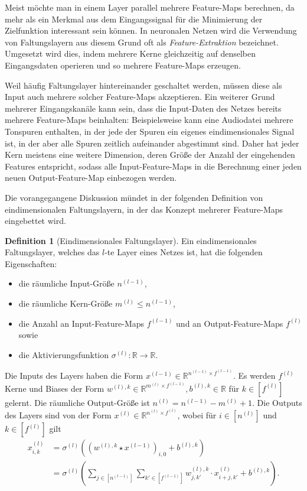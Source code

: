 \documentclass[paper=a4, 	%
		fontsize=11pt,
		abstract=true, 	%
		headsepline, 	%
		notitlepage	%
		]{scrartcl}
\theoremstyle{definition}
\newtheorem{definition}[theorem]{Definition}
\newcommand{\R}{\mathbb{R}}
\newcommand{\fNat}[1]{[ #1 ]}
\begin{document}
\medskip

Meist möchte man in einem Layer parallel mehrere Feature-Maps berechnen, da mehr als ein Merkmal aus dem Eingangssignal für die Minimierung der Zielfunktion interessant sein können.
In neuronalen Netzen wird die Verwendung von Faltungslayern aus diesem Grund oft als \emph{Feature-Extraktion} bezeichnet.
Umgesetzt wird dies, indem mehrere Kerne gleichzeitig auf denselben Eingangsdaten operieren und so mehrere Feature-Maps erzeugen.

Weil häufig Faltungslayer hintereinander geschaltet werden, müssen diese als Input auch mehrere solcher Feature-Maps akzeptieren.
Ein weiterer Grund mehrerer Eingangskanäle kann sein, dass die Input-Daten des Netzes bereits mehrere Feature-Maps beinhalten:
Beispielsweise kann eine Audiodatei mehrere Tonspuren enthalten, in der jede der Spuren ein eigenes eindimensionales Signal ist, in der aber alle Spuren zeitlich aufeinander abgestimmt sind.
Daher hat jeder Kern meistens eine weitere Dimension, deren Größe der Anzahl der eingehenden Features entspricht, sodass alle Input-Feature-Maps in die Berechnung einer jeden neuen Output-Feature-Map einbezogen werden.

\medskip
Die vorangegangene Diskussion mündet in der folgenden Definition von eindimensionalen Faltungslayern, in der das Konzept mehrerer Feature-Maps eingebettet wird.

\newpage
\begin{definition}[Eindimensionales Faltungslayer]\label{def:one-dimensional-conv-layer}
    Ein eindimensionales Faltungslayer, welches das $l$-te Layer eines Netzes ist, hat die folgenden Eigenschaften:
    \begin{itemize}
        \item die räumliche Input-Größe $n^{(l-1)}$,        
        \item die räumliche Kern-Größe $m^{(l)}\leq n^{(l-1)}$,
        \item die Anzahl an Input-Feature-Maps $f^{(l-1)}$ und an Output-Feature-Maps $f^{(l)}$ sowie
        \item die Aktivierungsfunktion $\sigma^{(l)}: \R \rightarrow \R$.
    \end{itemize}
    Die Inputs des Layers haben die Form $x^{(l-1)}\in\R^{n^{(l-1)} \times f^{(l-1)}}$.
    Es werden $f^{(l)}$ Kerne und Biases der Form $w^{(l),k}\in\R^{m^{(l)} \times f^{(l-1)}}, b^{(l),k}\in\R$ für  $k\in \fNat{f^{(l)}}$ gelernt.
    Die räumliche Output-Größe ist $n^{(l)} = n^{(l-1)}-  m^{(l)} + 1$.
    Die Outputs des Layers sind von der Form $x^{(l)}\in \R^{n^{(l)}\times f^{(l)}}$, wobei für $i\in\fNat{n^{(l)}}$ und $k\in\fNat{f^{(l)}}$ gilt
    \begin{align*}
        x^{(l)}_{i,k}
        &=  \sigma^{(l)}\left( (w^{(l),k} \star x^{(l-1)})_{i,0} + b^{(l),k} \right)\\
        &= \sigma^{(l)} \left( 
            \sum_{j \in \fNat{n^{(l-1)}}} \sum_{k'\in \fNat{f^{(l-1)}}}
            w^{(l),k}_{j,k'} \cdot x^{(l)}_{i+j, k'} + b^{(l), k}
        \right).
    \end{align*}
\end{definition}
\end{document}
